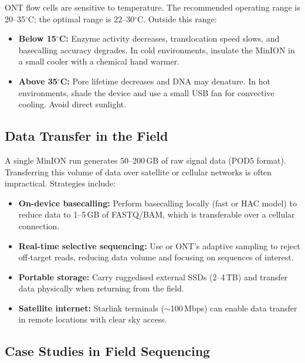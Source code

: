 \acrshort{ONT} flow cells are sensitive to temperature. The recommended operating range is 20--35$^{\circ}$C; the optimal range is 22--30$^{\circ}$C. Outside this range:

\begin{itemize}[itemsep=2pt]
  \item \textbf{Below 15$^{\circ}$C:} Enzyme activity decreases, translocation speed slows, and basecalling accuracy degrades. In cold environments, insulate the MinION in a small cooler with a chemical hand warmer.
  \item \textbf{Above 35$^{\circ}$C:} Pore lifetime decreases and DNA may denature. In hot environments, shade the device and use a small USB fan for convective cooling. Avoid direct sunlight.
\end{itemize}

\subsection{Data Transfer in the Field}
\label{subsec:accessible:datatransfer}

A single MinION run generates 50--200\,GB of raw signal data (POD5 format). Transferring this volume of data over satellite or cellular networks is often impractical. Strategies include:

\begin{itemize}[itemsep=2pt]
  \item \textbf{On-device basecalling:} Perform basecalling locally (fast or HAC model) to reduce data to 1--5\,GB of FASTQ/BAM, which is transferable over a cellular connection.
  \item \textbf{Real-time selective sequencing:} Use  or \acrshort{ONT}'s adaptive sampling to reject off-target reads, reducing data volume and focusing on sequences of interest.
  \item \textbf{Portable storage:} Carry ruggedised external SSDs (2--4\,TB) and transfer data physically when returning from the field.
  \item \textbf{Satellite internet:} Starlink terminals (${\sim}$100\,Mbps) can enable data transfer in remote locations with clear sky access.
\end{itemize}

\subsection{Case Studies in Field Sequencing}
\label{subsec:accessible:fieldcases}

